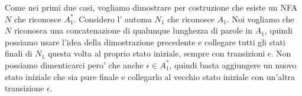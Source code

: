 Come nei primi due casi, vogliamo dimostrare per costruzione che esiste un NFA $ N $ che riconosce $ A_1^* $. Considero l' automa $ N_1 $ che riconosce $ A_1 $. Noi vogliamo che $ N $ riconosca una concatenazione di qualunque lunghezza di parole in $ A_1 $, quindi possiamo usare l'idea della dimostrazione precedente e collegare tutti gli stati finali di $ N_1 $ questa volta al proprio stato iniziale, sempre con transizioni $ \epsilon $. Non possiamo dimenticarci pero' che anche $ \epsilon \in A_1^* $, quindi basta aggiungere un nuovo stato iniziale che sia pure finale e collegarlo al vecchio stato iniziale con un'altra transizione $ \epsilon $.
